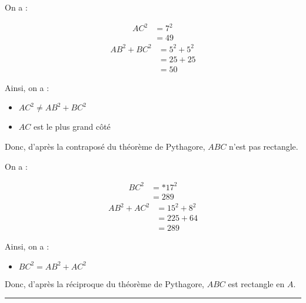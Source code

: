 \begin{multicols}{2}
    \exo{}{} On a :
    \begin{multicols}{2}
        \noindent
        \begin{align*}
            AC^2&=7^2\\
            &=49
        \end{align*}
        \begin{align*}
            AB^2+BC^2&=5^2+5^2\\
            &=25+25\\
            &=50
        \end{align*}
    \end{multicols}
    Ainsi, on a :
    \begin{itemize}
        \item $AC^2\neq  AB^2+BC^2$
        \item $AC$ est le plus grand côté
    \end{itemize}
    Donc, d'après la contraposé du théorème de Pythagore, $ABC$ n'est pas rectangle.

    \exo{}{} On a :
    \begin{multicols}{2}
        \noindent
        \begin{align*}
            BC^2&=*17^2\\
            &=289
        \end{align*}
        \begin{align*}
            AB^2+AC^2&=15^2+8^2\\
            &=225+64\\
            &=289
        \end{align*}
    \end{multicols}
    Ainsi, on a :
    \begin{itemize}
        \item $BC^2 = AB^2+AC^2$
    \end{itemize}
    Donc, d'après la réciproque du théorème de Pythagore, $ABC$ est rectangle en $A$.
\end{multicols}
\hrule \vspace{-0.5em}%
